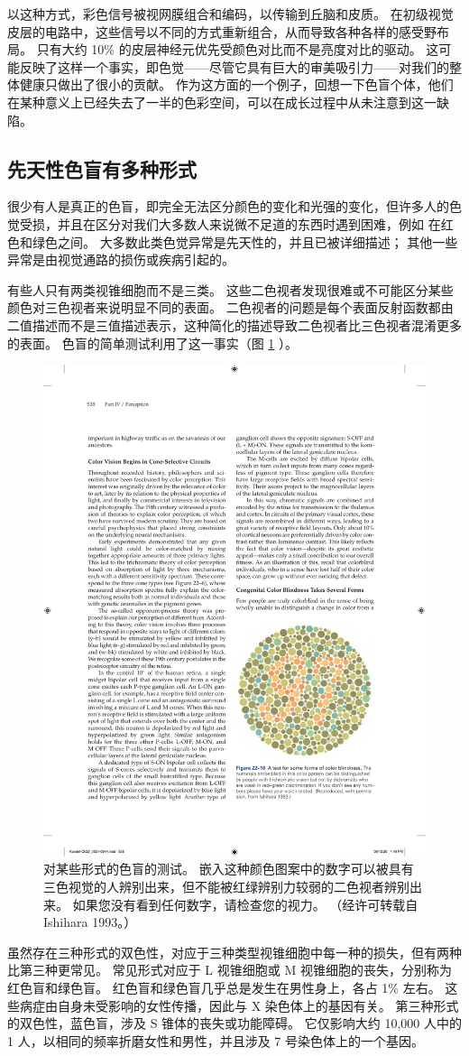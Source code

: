 以这种方式，彩色信号被视网膜组合和编码，以传输到丘脑和皮质。 
在初级视觉皮层的电路中，这些信号以不同的方式重新组合，从而导致各种各样的感受野布局。 
只有大约 10\% 的皮层神经元优先受颜色对比而不是亮度对比的驱动。 
这可能反映了这样一个事实，即色觉——尽管它具有巨大的审美吸引力——对我们的整体健康只做出了很小的贡献。 
作为这方面的一个例子，回想一下色盲个体，他们在某种意义上已经失去了一半的色彩空间，可以在成长过程中从未注意到这一缺陷。


\subsection{先天性色盲有多种形式}
很少有人是真正的色盲，即完全无法区分颜色的变化和光强的变化，但许多人的色觉受损，并且在区分对我们大多数人来说微不足道的东西时遇到困难，例如 在红色和绿色之间。 
大多数此类色觉异常是先天性的，并且已被详细描述； 
其他一些异常是由视觉通路的损伤或疾病引起的。


有些人只有两类视锥细胞而不是三类。 
这些二色视者发现很难或不可能区分某些颜色对三色视者来说明显不同的表面。 
二色视者的问题是每个表面反射函数都由二值描述而不是三值描述表示，这种简化的描述导致二色视者比三色视者混淆更多的表面。 
色盲的简单测试利用了这一事实（图 \ref{fig:22_16} ）。

\begin{figure}[htbp]
	\centering
	\includegraphics[width=0.5\linewidth]{chap22/fig_22_16}
	\caption{对某些形式的色盲的测试。 
		嵌入这种颜色图案中的数字可以被具有三色视觉的人辨别出来，但不能被红绿辨别力较弱的二色视者辨别出来。 
		如果您没有看到任何数字，请检查您的视力。 （经许可转载自 Ishihara 1993。）}
	\label{fig:22_16}
\end{figure}


虽然存在三种形式的双色性，对应于三种类型视锥细胞中每一种的损失，但有两种比第三种更常见。 
常见形式对应于 L 视锥细胞或 M 视锥细胞的丧失，分别称为红色盲和绿色盲。 
红色盲和绿色盲几乎总是发生在男性身上，各占 1\% 左右。 
这些病症由自身未受影响的女性传播，因此与 X 染色体上的基因有关。 
第三种形式的双色性，蓝色盲，涉及 S 锥体的丧失或功能障碍。 
它仅影响大约 10,000 人中的 1 人，以相同的频率折磨女性和男性，并且涉及 7 号染色体上的一个基因。


